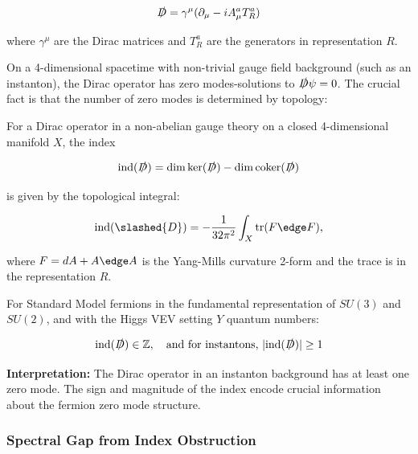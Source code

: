 \begin{equation}
\slashed{D} = \gamma^\mu (\partial_\mu - i A_\mu^a T^a_R)
\label{eq:diracYM}
\end{equation}

where $\gamma^\mu$ are the Dirac matrices and $T^a_R$ are the generators in representation $R$.

On a 4-dimensional spacetime with non-trivial gauge field background (such as an instanton), the Dirac operator has zero modes-solutions to $\slashed{D} \psi = 0$. The crucial fact is that the number of zero modes is determined by topology:

\begin{theorem}
\label{thm:diracIndexYM}

For a Dirac operator in a non-abelian gauge theory on a closed 4-dimensional manifold $X$, the index

\begin{equation}
\text{ind}(\slashed{D}) = \dim \ker(\slashed{D}) - \dim \text{coker}(\slashed{D})
\end{equation}

is given by the topological integral:

\begin{equation}
\text{ind}(\slashed{D}) = -\frac{1}{32\pi^2} \int_X \mathrm{tr}(F \edge F),
\label{eq:diracIndex}
\end{equation}

where $F = dA + A \edge A$ is the Yang-Mills curvature 2-form and the trace is in the representation $R$.

For Standard Model fermions in the fundamental representation of $SU(3)$ and $SU(2)$, and with the Higgs VEV setting $Y$ quantum numbers:

\begin{equation}
\text{ind}(\slashed{D}) \in \mathbb{Z}, \quad \text{and for instantons, } |\text{ind}(\slashed{D})| \geq 1
\end{equation}

\end{theorem}

\noindent\textbf{Interpretation:} The Dirac operator in an instanton background has at least one zero mode. The sign and magnitude of the index encode crucial information about the fermion zero mode structure.

\subsubsection{Spectral Gap from Index Obstruction}

